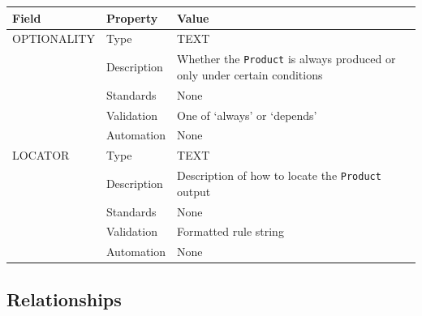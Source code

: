 \documentclass[
]{article}
\newcounter{none} %
\begin{document}
{\def\LTcaptype{none} %
\begin{longtable}[]{@{}
  >{\raggedright\arraybackslash}p{}
  >{\raggedright\arraybackslash}p{}
  >{\raggedright\arraybackslash}p{}@{}}
\toprule\noalign{}
\begin{minipage}[b]{\linewidth}\raggedright
Field
\end{minipage} & \begin{minipage}[b]{\linewidth}\raggedright
Property
\end{minipage} & \begin{minipage}[b]{\linewidth}\raggedright
Value
\end{minipage} \\
\midrule\noalign{}
\endhead
\bottomrule\noalign{}
\endlastfoot
OPTIONALITY & Type & TEXT \\
& Description & Whether the \texttt{Product} is always produced or only
under certain conditions \\
& Standards & None \\
& Validation & One of `always' or `depends' \\
& Automation & None \\
LOCATOR & Type & TEXT \\
& Description & Description of how to locate the \texttt{Product}
output \\
& Standards & None \\
& Validation & Formatted rule string \\
& Automation & None \\
\end{longtable}
}

\subsection{Relationships}\label{relationships-21}
\end{document}
